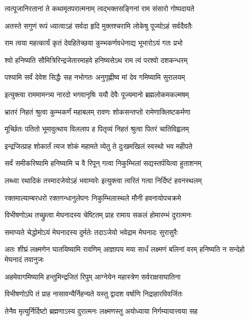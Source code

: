 \twolineshloka
{त्वत्पूजानिरतानां ते कथामृतपरात्मनाम्}
{त्वद्भक्तसङ्गिनां राम संसारो गोष्पदायते} %

\twolineshloka
{अतस्ते सगुणं रूपं ध्यात्वाऽहं सर्वदा हृदि}
{मुक्तश्चरामि लोकेषु पूज्योऽहं सर्वदैवतैः} %

\twolineshloka
{राम त्वया महत्कार्यं कृतं देवहितेच्छया}
{कुम्भकर्णवधेनाद्य भूभारोऽयं गतः प्रभो} %

\twolineshloka
{श्वो हनिष्यति सौमित्रिरिन्द्रजेतारमाहवे}
{हनिष्यसेऽथ राम त्वं परश्वो दशकन्धरम्} %

\twolineshloka
{पश्यामि सर्वं देवेश सिद्धैः सह नभोगतः}
{अनुगृह्णीष्व मां देव गमिष्यामि सुरालयम्} %

\twolineshloka
{इत्युक्त्वा राममामन्त्र्य नारदो भगवानृषिः}
{ययौ देवैः पूज्यमानो ब्रह्मलोकमकल्मषम्} %

\twolineshloka
{भ्रातरं निहतं श्रुत्वा कुम्भकर्णं महाबलम्}
{रावणः शोकसन्तप्तो रामेणाक्लिष्टकर्मणा} %

\twolineshloka
{मूर्च्छितः पतितो भूमावुत्थाय विललाप ह}
{पितृव्यं निहतं श्रुत्वा पितरं चातिविह्वलम्} %

\twolineshloka
{इन्द्रजित्प्राह शोकार्तं त्यज शोकं महामते}
{व्येतु ते दुःखमखिलं स्वस्थो भव महीपते} %

\twolineshloka
{सर्वं समीकरिष्यामि हनिष्यामि च वै रिपून्}
{गत्वा निकुम्भिलां सद्यस्तर्पयित्वा हुताशनम्} %

\twolineshloka
{लब्ध्वा रथादिकं तस्मादजेयोऽहं भवाम्यरेः}
{इत्युक्त्वा त्वरितं गत्वा निर्दिष्टं हवनस्थलम्} %

\twolineshloka
{रक्तमाल्याम्बरधरो रक्तगन्धानुलेपनः}
{निकुम्भिलास्थले मौनी हवनायोपचक्रमे} %

\twolineshloka
{विभीषणोऽथ तच्छ्रुत्वा मेघनादस्य चेष्टितम्}
{प्राह रामाय सकलं होमारम्भं दुरात्मनः} %

\twolineshloka
{समाप्यते चेद्धोमोऽयं मेघनादस्य दुर्मतेः}
{तदाऽजेयो भवेद्राम मेघनादः सुरासुरैः} %

\threelineshloka
{अतः शीघ्रं लक्ष्मणेन घातयिष्यामि रावणिम्}
{आज्ञापय मया सार्धं लक्ष्मणं बलिनां वरम्}
{हनिष्यति न सन्देहो मेघनादं तवानुजः} %


\twolineshloka
{अहमेवागमिष्यामि हन्तुमिन्द्रजितं रिपुम्}
{आग्नेयेन महास्त्रेण सर्वराक्षसघातिना} %

\twolineshloka
{विभीषणोऽपि तं प्राह नासावन्यैर्निहन्यते}
{यस्तु द्वादश वर्षाणि निद्राहारविवर्जितः} %

\twolineshloka
{तेनैव मृत्युर्निर्दिष्टो ब्रह्मणाऽस्य दुरात्मनः}
{लक्ष्मणस्तु अयोध्याया निर्गम्यायात्त्वया सह} %

